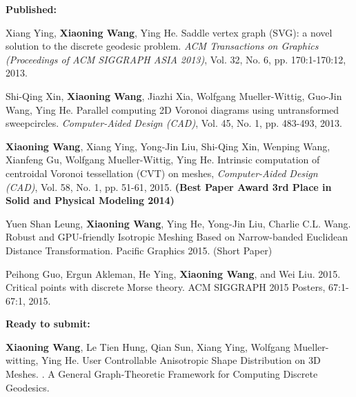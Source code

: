 \noindent\textbf{Published:}

Xiang Ying, \textbf{Xiaoning Wang}, Ying He. Saddle vertex graph (SVG): a novel solution to the discrete geodesic problem. \textit{ACM Transactions on Graphics (Proceedings of ACM SIGGRAPH ASIA 2013)}, Vol. 32, No. 6, pp. 170:1-170:12, 2013.

Shi-Qing Xin, \textbf{Xiaoning Wang}, Jiazhi Xia, Wolfgang Mueller-Wittig, Guo-Jin Wang, Ying He. Parallel computing 2D Voronoi diagrams using untransformed sweepcircles. \textit{Computer-Aided Design (CAD)}, Vol. 45, No. 1, pp. 483-493, 2013.

\textbf{Xiaoning Wang}, Xiang Ying, Yong-Jin Liu, Shi-Qing Xin, Wenping Wang, Xianfeng Gu, Wolfgang Mueller-Wittig, Ying He. Intrinsic computation of centroidal Voronoi tessellation (CVT) on meshes, \textit{Computer-Aided Design (CAD)}, Vol. 58, No. 1, pp. 51-61, 2015. \textbf{(Best Paper Award 3rd Place in Solid and Physical Modeling 2014)}

Yuen Shan Leung, \textbf{Xiaoning Wang}, Ying He, Yong-Jin Liu, Charlie C.L. Wang. Robust and GPU-friendly Isotropic Meshing Based on Narrow-banded Euclidean Distance Transformation. Pacific Graphics 2015. (Short Paper)

Peihong Guo, Ergun Akleman, He Ying, \textbf{Xiaoning Wang}, and Wei Liu. 2015. Critical points with discrete Morse theory. ACM SIGGRAPH 2015 Posters, 67:1-67:1, 2015.

\noindent\textbf{Ready to submit:}

\textbf{Xiaoning Wang}, Le Tien Hung, Qian Sun, Xiang Ying, Wolfgang Mueller-witting, Ying He. User Controllable Anisotropic Shape Distribution on 3D Meshes.
.
A General Graph-Theoretic Framework for Computing Discrete Geodesics.





